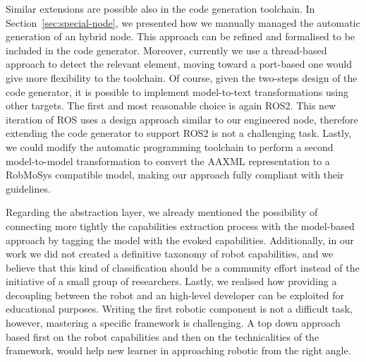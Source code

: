 Similar extensions are possible also in the code generation toolchain. In Section~\ref{sec:special-node}, we presented how we manually managed the automatic generation of an hybrid node. This approach can be refined and formalised to be included in the code generator. Moreover, currently we use a thread-based approach to detect the relevant element, moving toward a port-based one would give more flexibility to the toolchain. Of course, given the two-steps design of the code generator, it is possible to implement model-to-text transformations using other targets. The first and most reasonable choice is again ROS2. This new iteration of ROS uses a design approach similar to our engineered node, therefore extending the code generator to support ROS2 is not a challenging task. Lastly, we could modify the automatic programming toolchain to perform a second model-to-model transformation to convert the AAXML representation to a RobMoSys compatible model, making our approach fully compliant with their guidelines.

Regarding the abstraction layer, we already mentioned the possibility of connecting more tightly the capabilities extraction process with the model-based approach by tagging the model with the evoked capabilities. Additionally, in our work we did not created a definitive taxonomy of robot capabilities, and we believe that this kind of classification should be a community effort instead of the initiative of a small group of researchers. Lastly, we realised how providing a decoupling between the robot and an high-level developer can be exploited for educational purposes. Writing the first robotic component is not a difficult task, however, mastering a specific framework is challenging. A top down approach based first on the robot capabilities and then on the technicalities of the framework, would help new learner in approaching robotic from the right angle. 


